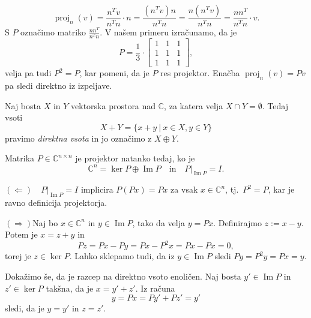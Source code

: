 \documentclass[mat1]{fmfdelo}
\newcommand{\C}{\mathbb C}
\DeclareMathOperator{\Ima}{Im}
\begin{document}
\begin{zgled}
\begin{equation*}
        \operatorname{proj}_{n}(v) = \frac{n^T  v}{n^T n}\cdot n = \frac{\left(n^T  v\right)n}{n^T n} = \frac{n\left(n^T  v\right)}{n^T n} = \frac{n  n^T}{n^T n}\cdot v.
    \end{equation*}
    S $P$ označimo matriko $\frac{n  n^T}{n^T n}$. V našem primeru izračunamo, da je
    \begin{equation*}
        P = \frac{1}{3}\cdot
        \begin{bmatrix}
            1 & 1 & 1 \\
            1 & 1 & 1 \\
            1 & 1 & 1
        \end{bmatrix},
    \end{equation*}
    velja pa tudi $P^2 = P$, kar pomeni, da je $P$ res projektor. Enačba $\operatorname{proj}_n (v) = P v$ pa sledi direktno iz izpeljave.
\end{zgled}
\begin{definicija}
    Naj bosta $X$ in $Y$ vektorska prostora nad $\C$, za katera velja $X \cap Y = \emptyset$. Tedaj vsoti
    \begin{equation*}
        X + Y = \{x+y \ |\ x\in X, y\in Y\}
    \end{equation*}
    pravimo \emph{direktna vsota} in jo označimo z $X \oplus Y$.
\end{definicija}
\begin{trditev}
    Matrika $P \in \C^{n \times n}$ je projektor natanko tedaj, ko je
    \begin{equation*}
        \C^n = \ker P \oplus \Ima P\quad  \text{in}\quad P|_{\Ima P} = I.
    \end{equation*}
\end{trditev}
\begin{dokaz}
    $(\Leftarrow)$$\quad P|_{\Ima P} = I$ implicira $P\left(P x\right) = P x$ za vsak $x \in \C^n$, tj.\ $P^2 = P$, kar je ravno definicija projektorja.

    $(\Rightarrow)$Naj bo $x \in \C^n$ in $y \in \Ima P$, tako da velja $y = P x$. Definirajmo $z := x-y$. Potem je $x = z + y$ in
    \begin{equation*}
        P z = P x - P y = P x - P^2 x = P x - P x = 0,
    \end{equation*}
    torej je $z\in \ker P$. Lahko sklepamo tudi, da iz $y \in \Ima P$ sledi $P y = P^2 y = P x = y$.

    Dokažimo še, da je razcep na direktno vsoto enoličen. Naj bosta $y' \in \Ima P$ in $z' \in \ker P$ takšna, da je $x = y' + z'$. Iz računa
    \begin{equation*}
        y = P x = P y' + P z' = y'
    \end{equation*}
    sledi, da je $y = y'$ in $z = z'$.
\end{dokaz}
\end{document}
